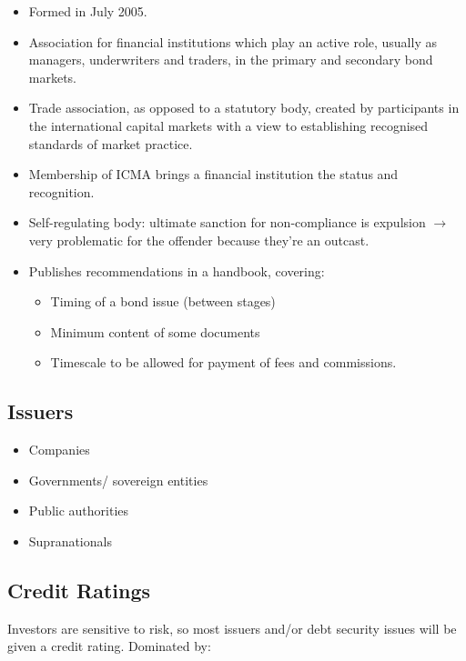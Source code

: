 \documentclass[
]{article}
\providecommand{\tightlist}{%
  \setlength{\itemsep}{0pt}\setlength{\parskip}{0pt}}
\begin{document}
\begin{itemize}
\tightlist
\item
  Formed in July 2005.
\item
  Association for financial institutions which play an active role,
  usually as managers, underwriters and traders, in the primary and
  secondary bond markets.
\item
  Trade association, as opposed to a statutory body, created by
  participants in the international capital markets with a view to
  establishing recognised standards of market practice.
\item
  Membership of ICMA brings a financial institution the status and
  recognition.
\item
  Self-regulating body: ultimate sanction for non-compliance is
  expulsion {\(\rightarrow\)} very problematic for the offender because
  they're an outcast.
\item
  Publishes recommendations in a handbook, covering:

  \begin{itemize}
  \tightlist
  \item
    Timing of a bond issue (between stages)
  \item
    Minimum content of some documents
  \item
    Timescale to be allowed for payment of fees and commissions.
  \end{itemize}
\end{itemize}

\hypertarget{issuers}{%
\subsection{Issuers}\label{issuers}}

\begin{itemize}
\tightlist
\item
  Companies
\item
  Governments/ sovereign entities
\item
  Public authorities
\item
  Supranationals
\end{itemize}

\hypertarget{credit-ratings}{%
\subsection{Credit Ratings}\label{credit-ratings}}

Investors are sensitive to risk, so most issuers and/or debt security
issues will be given a credit rating. Dominated by:
\end{document}
